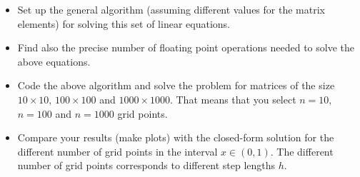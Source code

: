 
\begin{itemize}

\item Set up the general algorithm (assuming different values for the matrix elements) for solving this set of linear equations.

\item Find also the precise number of floating point 
operations needed to solve the above equations. 

\item Code the above algorithm and solve the problem for matrices of the size
$10\times 10$, $100\times 100$ and $1000\times 1000$.  That means that you select $n=10$, $n=100$ and
$n=1000$ grid points. 

\item Compare your results (make plots) with the closed-form solution for the different number of grid points  in the 
interval $x\in(0,1)$.  The different number of grid points corresponds to different step lengths $h$.

\end{itemize}
